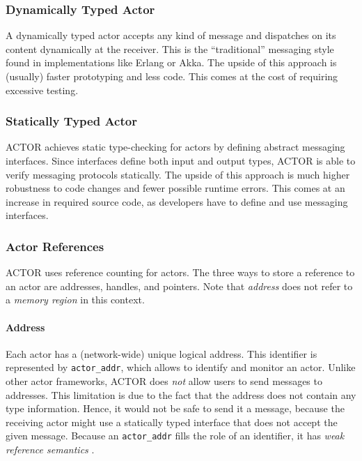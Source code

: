\subsubsection{Dynamically Typed Actor}

A dynamically typed actor accepts any kind of message and dispatches on its
content dynamically at the receiver. This is the ``traditional'' messaging
style found in implementations like Erlang or Akka. The upside of this approach
is (usually) faster prototyping and less code. This comes at the cost of
requiring excessive testing.

\subsubsection{Statically Typed Actor}

ACTOR achieves static type-checking for actors by defining abstract messaging
interfaces. Since interfaces define both input and output types, ACTOR is able to
verify messaging protocols statically. The upside of this approach is much
higher robustness to code changes and fewer possible runtime errors. This comes
at an increase in required source code, as developers have to define and use
messaging interfaces.

\subsubsection{Actor References}
\label{actor-reference}

ACTOR uses reference counting for actors. The three ways to store a reference to
an actor are addresses, handles, and pointers. Note that \emph{address} does
not refer to a \emph{memory region} in this context.

\paragraph{Address}
\label{actor-address}

Each actor has a (network-wide) unique logical address. This identifier is
represented by \lstinline^actor_addr^, which allows to identify and monitor an
actor. Unlike other actor frameworks, ACTOR does \emph{not} allow users to send
messages to addresses. This limitation is due to the fact that the address does
not contain any type information. Hence, it would not be safe to send it a
message, because the receiving actor might use a statically typed interface
that does not accept the given message. Because an \lstinline^actor_addr^ fills
the role of an identifier, it has \emph{weak reference semantics}
.


